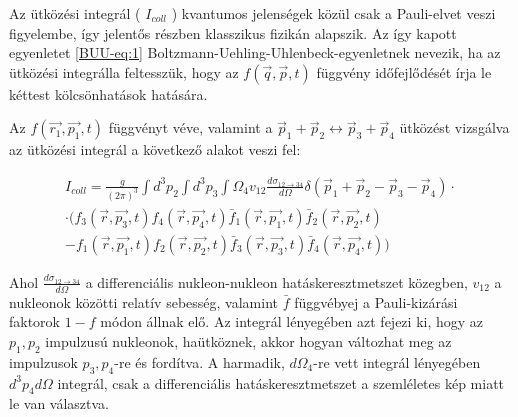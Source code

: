 \documentclass[a4paper,12pt]{article}
\begin{document}
\par Az ütközési integrál ( $I_{coll}$ ) kvantumos jelenségek közül csak a Pauli-elvet veszi figyelembe, így jelentős részben klasszikus fizikán alapszik. Az így kapott egyenletet \eqref{BUU-eq:1} Boltzmann-Uehling-Uhlenbeck-egyenletnek nevezik, ha az ütközési integrálla feltesszük, hogy az $f(\vec{q}, \vec{p}, t)$ függvény időfejlődését írja le kéttest kölcsönhatások hatására. 

\vspace{5mm}

\par Az $f(\vec{r_{1}}, \vec{p_{1}}, t)$ függvényt véve, valamint a $\vec{p}_{1} + \vec{p}_{2} \longleftrightarrow \vec{p}_{3} + \vec{p}_{4}$ ütközést vizsgálva az ütközési integrál a következő alakot veszi fel:

\vspace{5mm}

\begin{equation}
\begin{split}
I_{coll} = \frac{g}{(2\pi)^{3}}\int d^{3}p_{2}\int d^{3}p_{3}\int \Omega_{4}v_{12}\frac{d\sigma_{12 \rightarrow 34}}{d\Omega}\delta(\vec{p}_{1} + \vec{p}_{2} - \vec{p}_{3} - \vec{p}_{4})\cdot\\
\cdot(f_{3}(\vec{r}, \vec{p_{3}}, t)f_{4}(\vec{r}, \vec{p_{4}}, t)\bar{f}_{1}(\vec{r}, \vec{p_{1}}, t)\bar{f}_{2}(\vec{r}, \vec{p_{2}}, t) \\
- f_{1}(\vec{r}, \vec{p_{1}}, t)f_{2}(\vec{r}, \vec{p_{2}}, t)\bar{f}_{3}(\vec{r}, \vec{p_{3}}, t)\bar{f}_{4}(\vec{r}, \vec{p_{4}}, t))
\end{split}
\end{equation}

\vspace{5mm}

\par Ahol $\frac{d\sigma_{12 \rightarrow 34}}{d\Omega}$ a differenciális nukleon-nukleon hatáskeresztmetszet közegben, $v_{12}$ a nukleonok közötti relatív sebesség, valamint $\bar{f}$ függvébyej a Pauli-kizárási faktorok $1 - f$ módon állnak elő. Az integrál lényegében azt fejezi ki, hogy az $p_{1},p_{2}$ impulzusú nukleonok, haütköznek, akkor hogyan változhat meg az impulzusok $p_{3}, p_{4}$-re és fordítva. A harmadik, $d\Omega_{4}$-re vett integrál lényegében $d^{3}p_{4}d\Omega$ integrál, csak a differenciális hatáskeresztmetszet a szemléletes kép miatt le van választva.

\vspace{5mm}
\end{document}
